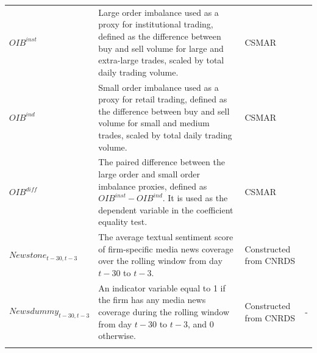 \documentclass[12pt]{article}
\begin{document}
\begin{xltabular}{\textwidth}{@{} >{\RaggedRight\arraybackslash}p{3.1cm} >{\RaggedRight\arraybackslash}X >{\RaggedRight\arraybackslash}p{2.6cm} >{\RaggedRight\arraybackslash}p{2.8cm} @{}}
  \addlinespace
  $OIB^{inst}$ & Large order imbalance used as a proxy for institutional trading, defined as the difference between buy and sell volume for large and extra-large trades, scaled by total daily trading volume. & CSMAR & \cite{lee1992,lee1991inferring,tong2013} \\
  \addlinespace
  $OIB^{ind}$ & Small order imbalance used as a proxy for retail trading, defined as the difference between buy and sell volume for small and medium trades, scaled by total daily trading volume. & CSMAR & \cite{lee1992,lee1991inferring,tong2013} \\
  \addlinespace
  $OIB^{diff}$ & The paired difference between the large order and small order imbalance proxies, defined as $OIB^{inst}-OIB^{ind}$. It is used as the dependent variable in the coefficient equality test. & CSMAR & \cite{lou2019,zellner1962} \\
  \addlinespace
  $Newstone_{t-30,t-3}$ & The average textual sentiment score of firm-specific media news coverage over the rolling window from day $t-30$ to $t-3$. & Constructed from CNRDS & \cite{ke2021predicting} \\
  \addlinespace
  $Newsdummy_{t-30,t-3}$ & An indicator variable equal to 1 if the firm has any media news coverage during the rolling window from day $t-30$ to $t-3$, and 0 otherwise. & Constructed from CNRDS & - \\
  \addlinespace
  \midrule


\end{xltabular}
\end{document}
